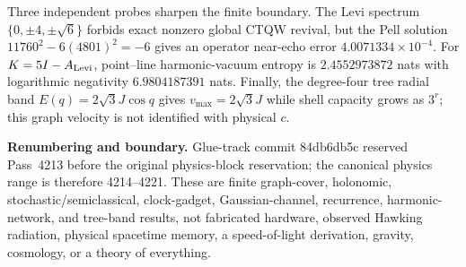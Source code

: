 Three independent probes sharpen the finite boundary. The Levi spectrum $\{0,\pm4,\pm\sqrt6\}$ forbids exact nonzero global CTQW revival, but the Pell solution $11760^2-6(4801)^2=-6$ gives an operator near-echo error $4.0071334\times10^{-4}$. For $K=5I-A_{\rm Levi}$, point--line harmonic-vacuum entropy is $2.4552973872$ nats with logarithmic negativity $6.9804187391$ nats. Finally, the degree-four tree radial band $E(q)=2\sqrt3J\cos q$ gives $v_{\max}=2\sqrt3J$ while shell capacity grows as $3^r$; this graph velocity is not identified with physical $c$.

\textbf{Renumbering and boundary.} Glue-track commit 84db6db5c reserved Pass~4213 before the original physics-block reservation; the canonical physics range is therefore 4214--4221. These are finite graph-cover, holonomic, stochastic/semiclassical, clock-gadget, Gaussian-channel, recurrence, harmonic-network, and tree-band results, not fabricated hardware, observed Hawking radiation, physical spacetime memory, a speed-of-light derivation, gravity, cosmology, or a theory of everything.
